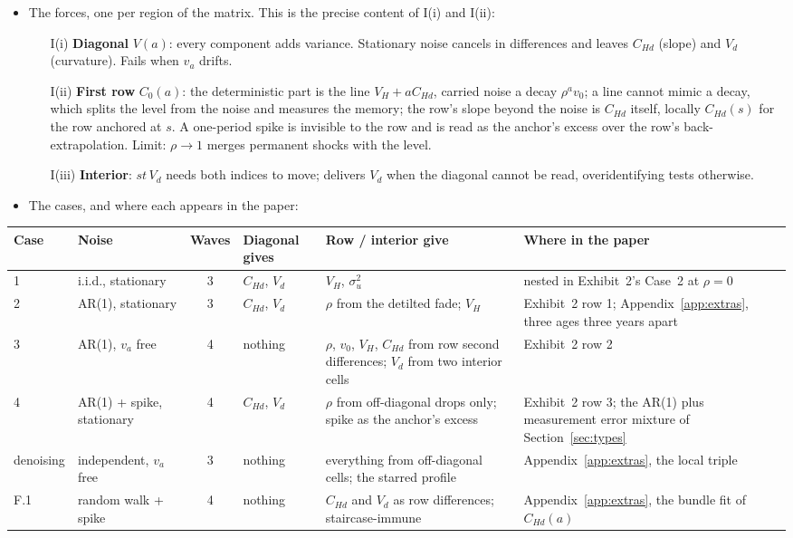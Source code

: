 \documentclass[11pt]{article}
\begin{document}
\begin{itemize}
\item The forces, one per region of the matrix. This is the precise content of I(i) and I(ii):
\begin{itemize}
\item[I(i)] \textbf{Diagonal} $V(a)$: every component adds variance. Stationary noise cancels in differences and leaves $C_{Hd}$ (slope) and $V_d$ (curvature). Fails when $v_a$ drifts.
\item[I(ii)] \textbf{First row} $C_0(a)$: the deterministic part is the line $V_H+aC_{Hd}$, carried noise a decay $\rho^av_0$; a line cannot mimic a decay, which splits the level from the noise and measures the memory; the row's slope beyond the noise is $C_{Hd}$ itself, locally $C_{Hd}(s)$ for the row anchored at $s$. A one-period spike is invisible to the row and is read as the anchor's excess over the row's back-extrapolation. Limit: $\rho\to1$ merges permanent shocks with the level.
\item[I(iii)] \textbf{Interior}: $st\,V_d$ needs both indices to move; delivers $V_d$ when the diagonal cannot be read, overidentifying tests otherwise.
\end{itemize}
\item The cases, and where each appears in the paper:
\end{itemize}

\begin{center}\footnotesize\setlength{\tabcolsep}{3pt}
\begin{tabular}{@{}lp{2.5cm}cp{1.7cm}p{4.6cm}p{4.2cm}@{}}
\toprule
Case & Noise & Waves & Diagonal gives & Row / interior give & Where in the paper \\
\midrule
1 & i.i.d., stationary & 3 & $C_{Hd}$, $V_d$ & $V_H$, $\sigma^2_u$ & nested in Exhibit~2's Case~2 at $\rho=0$ \\
2 & AR(1), stationary & 3 & $C_{Hd}$, $V_d$ & $\rho$ from the detilted fade; $V_H$ & Exhibit~2 row 1; Appendix~\ref{app:extras}, three ages three years apart \\
3 & AR(1), $v_a$ free & 4 & nothing & $\rho$, $v_0$, $V_H$, $C_{Hd}$ from row second differences; $V_d$ from two interior cells & Exhibit~2 row 2 \\
4 & AR(1) + spike, stationary & 4 & $C_{Hd}$, $V_d$ & $\rho$ from off-diagonal drops only; spike as the anchor's excess & Exhibit~2 row 3; the AR(1) plus measurement error mixture of Section~\ref{sec:types} \\
denoising & independent, $v_a$ free & 3 & nothing & everything from off-diagonal cells; the starred profile & Appendix~\ref{app:extras}, the local triple \\
F.1 & random walk + spike & 4 & nothing & $C_{Hd}$ and $V_d$ as row differences; staircase-immune & Appendix~\ref{app:extras}, the bundle fit of $C_{Hd}(a)$ \\
\bottomrule
\end{tabular}
\end{center}
\end{document}
